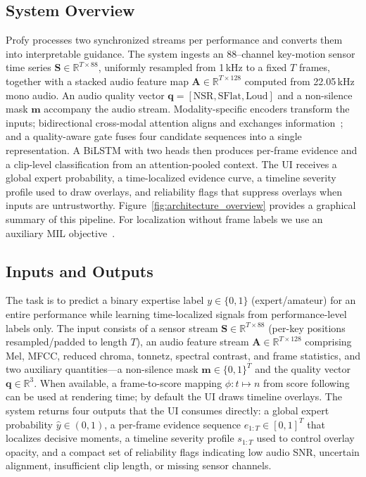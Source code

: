 \documentclass[sigconf,review,anonymous]{acmart}
\begin{document}
\subsection{System Overview}
\label{subsec:overview}
Profy processes two synchronized streams per performance and converts them into interpretable guidance. The system ingests an 88–channel key-motion sensor time series $\mathbf{S}\in\mathbb{R}^{T\times 88}$, uniformly resampled from 1\,kHz to a fixed $T$ frames, together with a stacked audio feature map $\mathbf{A}\in\mathbb{R}^{T\times 128}$ computed from 22.05\,kHz mono audio. An audio quality vector $\mathbf{q}=[\mathrm{NSR},\mathrm{SFlat},\mathrm{Loud}]$ and a non-silence mask $\mathbf{m}$ accompany the audio stream. Modality-specific encoders transform the inputs; bidirectional cross-modal attention aligns and exchanges information~\cite{Vaswani2017,Lu2019ViLBERT}; and a quality-aware gate fuses four candidate sequences into a single representation. A BiLSTM with two heads then produces per-frame evidence and a clip-level classification from an attention-pooled context. The UI receives a global expert probability, a time-localized evidence curve, a timeline severity profile used to draw overlays, and reliability flags that suppress overlays when inputs are untrustworthy. Figure~\ref{fig:architecture_overview} provides a graphical summary of this pipeline. For localization without frame labels we use an auxiliary MIL objective~\cite{Pinheiro2015,Ilse2018}.

\subsection{Inputs and Outputs}
\label{subsec:io}
The task is to predict a binary expertise label $y\in\{0,1\}$ (expert/amateur) for an entire performance while learning time-localized signals from performance-level labels only. The input consists of a sensor stream $\mathbf{S}\in\mathbb{R}^{T\times 88}$ (per-key positions resampled/padded to length $T$), an audio feature stream $\mathbf{A}\in\mathbb{R}^{T\times 128}$ comprising Mel, MFCC, reduced chroma, tonnetz, spectral contrast, and frame statistics, and two auxiliary quantities---a non-silence mask $\mathbf{m}\in\{0,1\}^T$ and the quality vector $\mathbf{q}\in\mathbb{R}^{3}$. When available, a frame-to-score mapping $\phi:t\mapsto n$ from score following can be used at rendering time; by default the UI draws timeline overlays. The system returns four outputs that the UI consumes directly: a global expert probability $\hat{y}\in(0,1)$, a per-frame evidence sequence $e_{1:T}\in[0,1]^T$ that localizes decisive moments, a timeline severity profile $s_{1:T}$ used to control overlay opacity, and a compact set of reliability flags indicating low audio SNR, uncertain alignment, insufficient clip length, or missing sensor channels.
\end{document}
